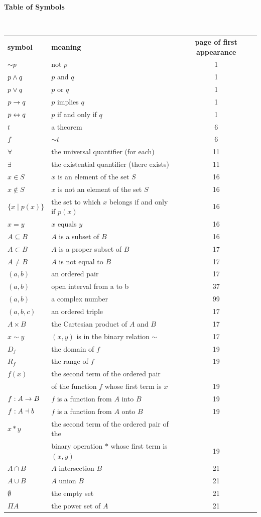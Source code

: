 \newpage
\lhead{}
\begin{center}
\textbf{Table of Symbols}
\end{center}
$ $\nl
\begin{tabular}{l l c}
\textbf{symbol}&\textbf{meaning}&\textbf{page of first appearance}\\
$\sim p$& not $p$ &1\\
$p\wedge q$& $p$ and $q$ &1\\
$p\lor q$ &$p$ or $q$& 1 \\
$p\to q$& $p$ implies $q$ &1\\
$p \leftrightarrow q$&$p$ if and only if $q$& l\\
$t$ &a theorem &6 \\
$f$ &$\sim t$ &6 \\
$\forall $ &the universal quantifier (for each)& 11\\
$\exists$&the existential quantifier (there exists) & 11 \\
$x\in S$ &$x$ is an element of the set $S$& 16 \\
$x\notin S$ &$x$ is not an element of the set $S$& 16 \\
$\{x \mid p(x)\}$ &the set to which $x$ belongs if and only if $p(x)$& 16 \\
$x = y$ &$x$ equals $y$ &16 \\
$A\subseteq B$ &$A$ is a subset of $B$ &16 \\
$A \subset B$ &$A$ is a proper subset of $B$& 17 \\
$A \neq B$ &$A$ is not equal to $B$ &17 \\
$(a,b)$&an ordered pair &17 \\
$(a,b)$& open interval from a to b &37 \\
$(a,b)$&a complex number &99\\
$(a,b,c)$ &an ordered triple &17\\
$A\times B$ &the Cartesian product of $A$ and $B$ &17\\
$x\sim y$ &$(x,y)$ is in the binary relation $\sim$ &17 \\
$D_{f}$ &the domain of $f$& 19 \\
$R_{f}$ &the range of $f$& 19\\
$f(x)$ &the second term of the ordered pair &\\
& of the function $f$ whose first term is $x$ &19 \\
$f:A\to B$ &$f$ is a function from $A$ into $B$ &19\\
$f:A\dashv b$ &$f$ is a function from $A$ onto $B$& 19 \\
$x\ast y$ &the second term of the ordered pair of the &\\
&binary operation $\ast$ whose first term is $(x,y)$ &19 \\
$A\cap B$ &$A$ intersection $B$ &21 \\
$A\cup B$& $A$ union $B$& 21 \\
$\emptyset$&the empty set &21 \\
$\Pi A$& the power set of $A$ &21 \\
\end{tabular}

